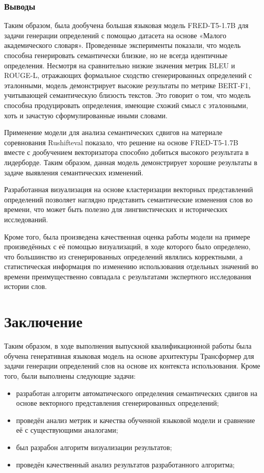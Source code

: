 \documentclass[LI,VKR]{HSEUniversity}
\begin{document}
\subsection*{Выводы}

Таким образом, была дообучена большая языковая модель FRED-T5-1.7B для задачи
генерации определений с помощью датасета на основе «Малого академического словаря».
Проведенные эксперименты показали,
что модель способна генерировать семантически близкие,
но не всегда идентичные определения.
Несмотря на сравнительно низкие значения метрик BLEU и ROUGE-L,
отражающих формальное сходство сгенерированных определений с эталонными,
модель демонстрирует высокие результаты по метрике BERT-F1,
учитывающей семантическую близость текстов.
Это говорит о том, что модель способна продуцировать определения,
имеющие схожий смысл с эталонными, хоть и зачастую сформулированные иными словами.

Применение модели для анализа семантических сдвигов на материале соревнования Rushifteval показало,
что решение на основе FRED-T5-1.7B вместе с дообучением векторизатора способно добиться высокого
результата в лидерборде.
Таким образом, данная модель демонстрирует хорошие результаты в задаче выявления семантических изменений.

Разработанная визуализация на основе кластеризации векторных представлений определений позволяет
наглядно представить семантические изменения слов во времени,
что может быть полезно для лингвистических и исторических исследований.

Кроме того, была произведена качественная оценка работы модели на примере произведённых
с её помощью визуализаций, в ходе которого было определено, что большинство
из сгенерированных определений являлись корректными, а статистическая информация
по изменению использования отдельных значений во времени преимущественно совпадала
с результатами экспертного исследования истории слов.

\chapter*{Заключение}

Таким образом, в ходе выполнения выпускной квалификационной работы была обучена генеративная языковая модель
на основе архитектуры Трансформер для задачи генерации определений слов на основе их
контекста использования.
Кроме того, были выполнены следующие задачи:
\begin{itemize}
    \item разработан алгоритм автоматического определения семантических сдвигов на
основе векторного представления сгенерированных определений;
    \item проведён анализ метрик и качества обученной языковой модели и
сравнение её с существующими аналогами;
    \item был разрабон алгоритм визуализации результатов;
    \item проведён качественный анализ результатов разработанного алгоритма;
\end{itemize}
\end{document}
